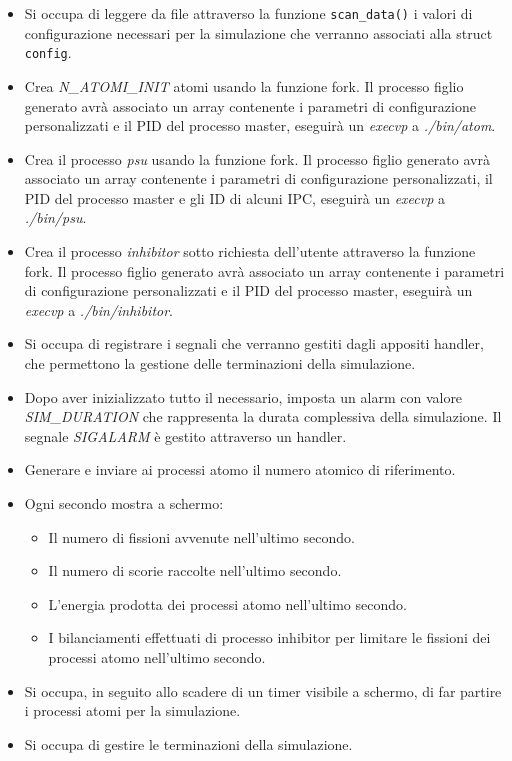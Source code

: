 \begin{itemize}
    \item Si occupa di leggere da file attraverso la funzione \lstinline{scan_data()} i valori di configurazione necessari per la simulazione che verranno associati alla struct \lstinline{config}. 
    \item Crea \textit{N_ATOMI_INIT} atomi usando la funzione fork. Il processo figlio generato avrà associato un array contenente i parametri di configurazione personalizzati e il PID del processo master, eseguirà un \textit{execvp} a \textit{./bin/atom}.
    \item Crea il processo \textit{psu} usando la funzione fork. Il processo figlio generato avrà associato un array contenente i parametri di configurazione personalizzati, il PID del processo master e gli ID di alcuni IPC, eseguirà un \textit{execvp} a \textit{./bin/psu}. 
    \item Crea il processo \textit{inhibitor} sotto richiesta dell'utente attraverso la funzione fork. Il processo figlio generato avrà associato un array contenente i parametri di configurazione personalizzati e il PID del processo master, eseguirà un \textit{execvp} a \textit{./bin/inhibitor}.
    \item Si occupa di registrare i segnali che verranno gestiti dagli appositi handler, che permettono la gestione delle terminazioni della simulazione. 
    \item Dopo aver inizializzato tutto il necessario, imposta un alarm con valore \textit{SIM_DURATION} che rappresenta la durata complessiva della simulazione. Il segnale \textit{SIGALARM} è gestito attraverso un handler.
    \item Generare e inviare ai processi atomo il numero atomico di riferimento. 
    \item Ogni secondo mostra a schermo: 
    \begin{itemize}
        \item Il numero di fissioni avvenute nell'ultimo secondo. 
        \item Il numero di scorie raccolte nell'ultimo secondo.
        \item L'energia prodotta dei processi atomo nell'ultimo secondo.
        \item I bilanciamenti effettuati di processo inhibitor per limitare le fissioni dei processi atomo nell'ultimo secondo. 
    \end{itemize}
    \item Si occupa, in seguito allo scadere di un timer visibile a schermo, di far partire i processi atomi per la simulazione. 
    \item Si occupa di gestire le terminazioni della simulazione.
\end{itemize}
